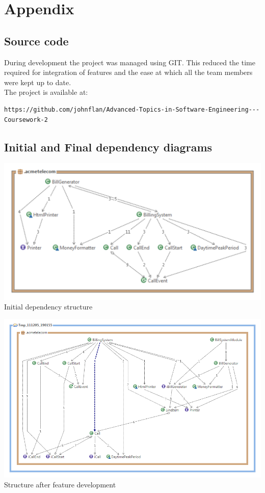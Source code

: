\section{Appendix}

\subsection{Source code}
During development the project was managed using GIT. This reduced the time required for integration of features and the ease at which all the team members were kept up to date.\\
The project is available at:
\begin{lstlisting}
https://github.com/johnflan/Advanced-Topics-in-Software-Engineering---Coursework-2
\end{lstlisting}

\subsection{Initial and Final dependency diagrams}



\begin{center}
	\includegraphics[scale=0.7]{images/Acme_Telecom_Structure.pdf}
Initial dependency structure
\end{center}

\begin{center}
	\includegraphics[scale=0.45]{images/AcmeTelecom_Software_Structure_After_Refactoring.png}\\
Structure after feature development
\end{center}

